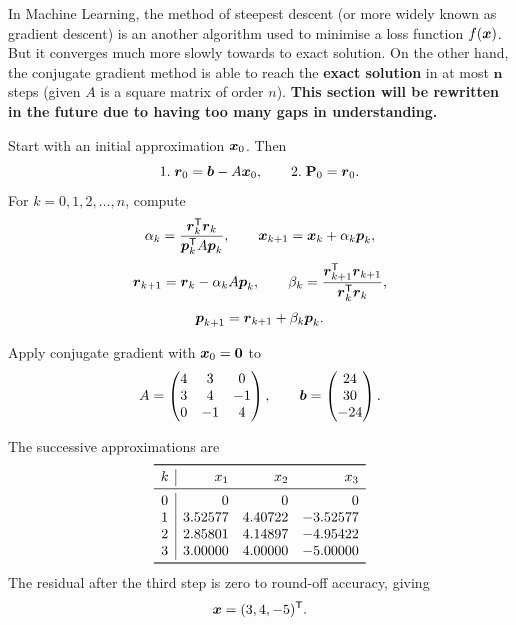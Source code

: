 In Machine Learning, the method of steepest descent (or more widely known as gradient descent) is an another algorithm used to minimise a loss function $f(\boldsymbol{x})$. 
But it converges much more slowly towards to exact solution.
On the other hand, the conjugate gradient method is able to reach the \textbf{exact solution} in at most $\mathbf{n}$ steps (given $A$ is a square matrix of order $n$).
\textbf{This section will be rewritten in the future due to having too many gaps in understanding.}

\begin{algorithm}
Start with an initial approximation $\boldsymbol{x}_0$. Then
\[
 1.\;\boldsymbol{r}_0=\boldsymbol{b}-A\boldsymbol{x}_0,
 \qquad
 2.\;\mathbf{P}_0=\boldsymbol{r}_0.
\]
For $k=0,1,2,\ldots,n$, compute
\[
 \alpha_k=\frac{\boldsymbol{r}_k^{\mathsf T}\boldsymbol{r}_k}{\boldsymbol{p}_k^{\mathsf T} A\boldsymbol{p}_k},
 \qquad
 \boldsymbol{x}_{k+1}=\boldsymbol{x}_k+\alpha_k\boldsymbol{p}_k,
\]
\[
 \boldsymbol{r}_{k+1}=\boldsymbol{r}_k-\alpha_kA\boldsymbol{p}_k,
 \qquad
 \beta_k=\frac{\boldsymbol{r}_{k+1}^{\mathsf T}\boldsymbol{r}_{k+1}}{\boldsymbol{r}_k^{\mathsf T}\boldsymbol{r}_k},
\]
\[
 \boldsymbol{p}_{k+1}=\boldsymbol{r}_{k+1}+\beta_k\boldsymbol{p}_k.
\]
\end{algorithm}

\begin{example}
Apply conjugate gradient with $\boldsymbol{x}_0=\boldsymbol{0}$ to
\[
 A=\begin{pmatrix}
4&3&0\\3&4&-1\\0&-1&4
\end{pmatrix},
\qquad
\boldsymbol{b}=\begin{pmatrix}24\\30\\-24\end{pmatrix}.
\]
\end{example}

\begin{solution}[7.0cm]
The successive approximations are
\[
\begin{array}{c|rrr}
\toprule
k&x_1&x_2&x_3\\
\midrule
0&0&0&0\\
1&3.52577&4.40722&-3.52577\\
2&2.85801&4.14897&-4.95422\\
3&3.00000&4.00000&-5.00000\\
\bottomrule
\end{array}
\]
The residual after the third step is zero to round-off accuracy, giving
\[
 \boldsymbol{x}=(3,4,-5)^{\mathsf T}.
\]
\end{solution}

